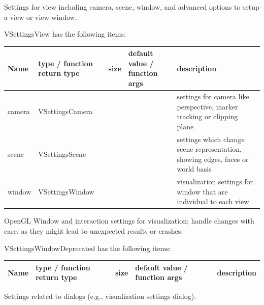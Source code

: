
\label{sec:VSettingsView}
Settings for view including camera, scene, window, and advanced options to setup a view or view window.

\noindent VSettingsView has the following items:
\begin{center}
  \footnotesize
  \begin{longtable}{| p{4.2cm} | p{2.5cm} | p{0.3cm} | p{3.0cm} | p{6cm} |}
    \hline
    \bf Name & \bf type / function return type & \bf size & \bf default value / function args & \bf description \\ \hline
    camera &     VSettingsCamera &      &      &     settings for camera like perspective, marker tracking or clipping plane\\ \hline
    scene &     VSettingsScene &      &      &     settings which change scene representation, showing edges, faces or world basis\\ \hline
    window &     VSettingsWindow &      &      &     visualization settings for window that are individual to each view\\ \hline
	  \end{longtable}
	\end{center}



\label{sec:VSettingsWindowDeprecated}
OpenGL Window and interaction settings for visualization; handle changes with care, as they might lead to unexpected results or crashes.

\noindent VSettingsWindowDeprecated has the following items:
\begin{center}
  \footnotesize
  \begin{longtable}{| p{4.2cm} | p{2.5cm} | p{0.3cm} | p{3.0cm} | p{6cm} |}
    \hline
    \bf Name & \bf type / function return type & \bf size & \bf default value / function args & \bf description \\ \hline
	  \end{longtable}
	\end{center}



\label{sec:VSettingsDialogs}
Settings related to dialogs (e.g., visualization settings dialog).

